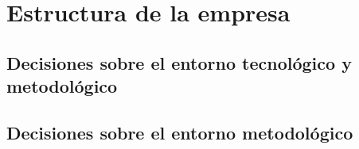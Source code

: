 \section{Estructura de la empresa}

\subsection{Decisiones sobre el entorno tecnológico y metodológico}





\subsection{Decisiones sobre el entorno metodológico}